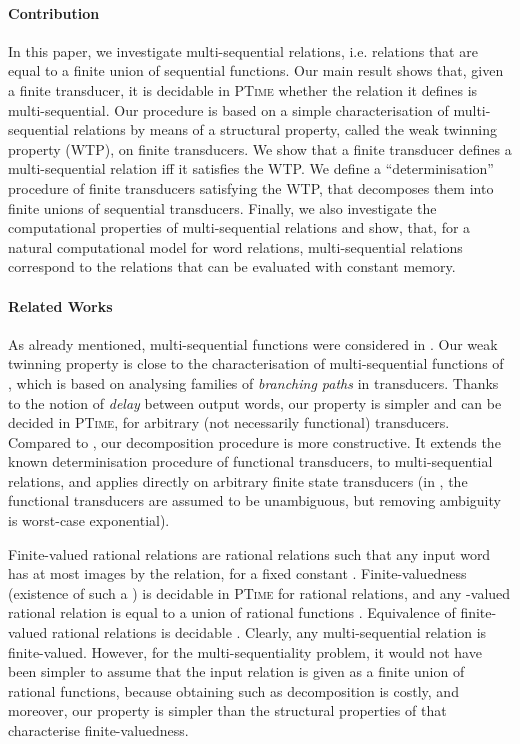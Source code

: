 \documentclass[envcountsame]{llncs}
\begin{document}
\paragraph{Contribution} In this paper, we investigate multi-sequential relations,
i.e. relations that are equal to a finite union of sequential functions. Our
main result shows that, given a finite transducer, it is decidable in
\textsc{PTime} whether the relation it defines is
multi-sequential. Our procedure is based on a simple characterisation
of multi-sequential relations by means of a structural property,
called the weak twinning property (WTP), on finite transducers. We
show that a finite transducer defines a multi-sequential relation iff
it satisfies the WTP. We define a ``determinisation'' procedure of
finite transducers satisfying the WTP, that decomposes them into finite
unions of sequential transducers. Finally, we also investigate the
computational properties of multi-sequential relations and show, that,
for a natural computational model for word relations, 
multi-sequential relations correspond to the relations that
can be evaluated with constant memory.


\paragraph{Related Works} As already mentioned, multi-sequential
functions were considered in \cite{DBLP:conf/stacs/ChoffrutS86}. Our
weak twinning property is close to the characterisation of
multi-sequential functions of \cite{DBLP:conf/stacs/ChoffrutS86}, which is based on analysing 
families of \emph{branching paths} in transducers. Thanks to the
notion of \emph{delay} between output words, our property is simpler
and can be decided in \textsc{PTime}, for arbitrary (not
necessarily functional) transducers. Compared to
\cite{DBLP:conf/stacs/ChoffrutS86}, our decomposition procedure is
more constructive. It extends the known determinisation procedure of
functional transducers, to multi-sequential relations, and applies
directly on arbitrary finite state transducers (in
\cite{DBLP:conf/stacs/ChoffrutS86}, the functional transducers are assumed to be
unambiguous, but removing ambiguity is worst-case exponential). 



Finite-valued rational relations are rational relations such that any
input word has at most  images by the relation, for a fixed
constant . Finite-valuedness (existence of such a ) is decidable in \textsc{PTime} for
rational relations, and any -valued rational relation is equal to a
union of  rational functions \cite{journals/mst/SakarovitchS10,SICOMP::Weber1993,DBLP:journals/acta/Weber89}. 
Equivalence of finite-valued rational relations is decidable
\cite{GurIba83}. Clearly, any multi-sequential relation is
finite-valued. However, for the multi-sequentiality problem, it would
not have been simpler to assume that the input relation is given as a
finite union of rational functions, because obtaining such as
decomposition is costly, and moreover, our property is simpler than the structural properties 
of \cite{journals/mst/SakarovitchS10,DBLP:journals/acta/Weber89} that 
characterise finite-valuedness.
\end{document}
